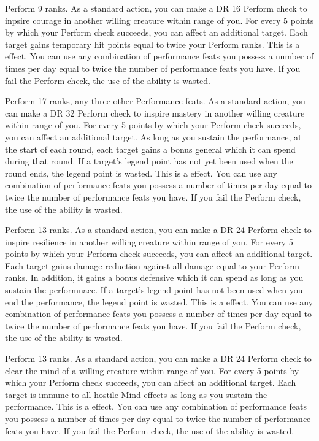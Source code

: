 \featpre Perform 9 ranks.
\featben As a standard action, you can make a DR 16 Perform check to inpsire courage in another willing creature within \rngmed range of you.
For every 5 points by which your Perform check succeeds, you can affect an additional target.
Each target gains temporary hit points equal to twice your Perform ranks.
This is a  effect.
 You can use any combination of performance feats you possess a number of times per day equal to twice the number of performance feats you have.
If you fail the Perform check, the use of the ability is wasted.

\featpres Perform 17 ranks, any three other Performance feats.
\featben As a standard action, you can make a DR 32 Perform check to inspire mastery in another willing creature within \rngmed range of you.
For every 5 points by which your Perform check succeeds, you can affect an additional target.
As long as you sustain the performance, at the start of each round, each target gains a bonus general  which it can spend during that round.
If a target's legend point has not yet been used when the round ends, the legend point is wasted.
This is a  effect.
 You can use any combination of performance feats you possess a number of times per day equal to twice the number of performance feats you have.
If you fail the Perform check, the use of the ability is wasted.

\featpre Perform 13 ranks.
\featben As a standard action, you can make a DR 24 Perform check to inspire resilience in another willing creature within \rngmed range of you.
For every 5 points by which your Perform check succeeds, you can affect an additional target.
Each target gains damage reduction against all damage equal to your Perform ranks.
In addition, it gains a bonus defensive  which it can spend as long as you sustain the performnace.
If a target's legend point has not been used when you end the performance, the legend point is wasted.
This is a  effect.
 You can use any combination of performance feats you possess a number of times per day equal to twice the number of performance feats you have.
If you fail the Perform check, the use of the ability is wasted.

\featpre Perform 13 ranks.
\featben As a standard action, you can make a DR 24 Perform check to clear the mind of a willing creature within \rngmed range of you.
For every 5 points by which your Perform check succeeds, you can affect an additional target.
Each target is immune to all hostile Mind effects as long as you sustain the performance.
This is a  effect.
You can use any combination of performance feats you possess a number of times per day equal to twice the number of performance feats you have.
If you fail the Perform check, the use of the ability is wasted.

